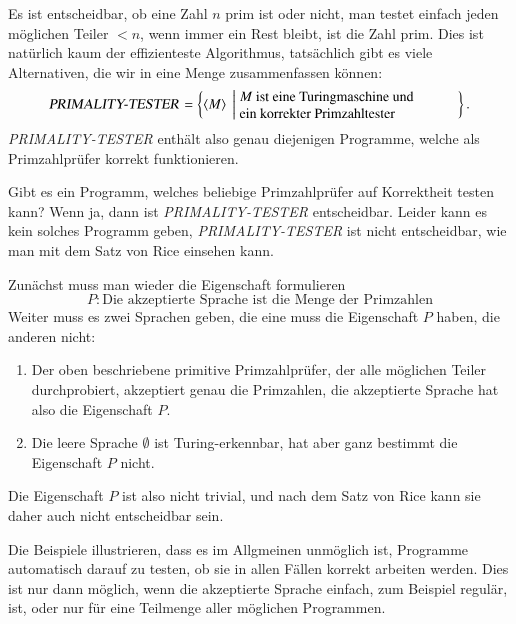\begin{beispiel}[\bf Primzahlprüfer] Es ist entscheidbar, ob eine Zahl $n$
prim ist oder nicht, man testet einfach jeden möglichen Teiler $<n$,
wenn immer ein Rest bleibt, ist die Zahl prim.
Dies ist natürlich
kaum der effizienteste Algorithmus, tatsächlich gibt es viele Alternativen,
die wir in eine Menge zusammenfassen können:
\[
\text{\textsl{PRIMALITY-TESTER}}=
\left\{\langle M\rangle\;\left|\;
\begin{minipage}{2.15truein}
\raggedright
$M$ ist eine Turingmaschine und\\
ein korrekter Primzahltester
\end{minipage}
\right.\right\}.
\]
%
\textsl{PRIMALITY-TESTER} enthält also genau diejenigen Programme, welche
als Primzahlprüfer korrekt funktionieren.

Gibt es ein Programm, welches beliebige Primzahlprüfer auf Korrektheit
testen kann? Wenn ja, dann ist \textsl{PRIMALITY-TESTER} entscheidbar.
Leider kann es kein solches Programm geben,
\textsl{PRIMALITY-TESTER} ist nicht entscheidbar, wie man mit dem Satz
von Rice einsehen kann.

Zunächst muss man wieder die Eigenschaft formulieren
\[
P: \text{Die akzeptierte Sprache ist die Menge der Primzahlen}
\]
Weiter muss es zwei Sprachen geben, die eine muss die Eigenschaft
$P$ haben, die anderen nicht:
\begin{enumerate}
\item
Der oben beschriebene primitive Primzahlprüfer, der alle möglichen Teiler
durchprobiert, akzeptiert genau die Primzahlen, die akzeptierte Sprache
hat also die Eigenschaft $P$.
\item 
Die leere Sprache $\emptyset$ ist Turing-erkennbar, hat aber ganz bestimmt
die Eigenschaft $P$ nicht.
\end{enumerate}
Die Eigenschaft $P$ ist also nicht trivial, und nach dem Satz von Rice
kann sie daher auch nicht entscheidbar sein.
\end{beispiel}

Die Beispiele illustrieren, dass es im Allgmeinen unmöglich ist, Programme
automatisch darauf zu testen, ob sie in allen Fällen korrekt arbeiten
werden.
Dies ist nur dann möglich, wenn die akzeptierte Sprache einfach,
zum Beispiel regulär, ist, oder nur für eine Teilmenge aller möglichen
Programmen.
